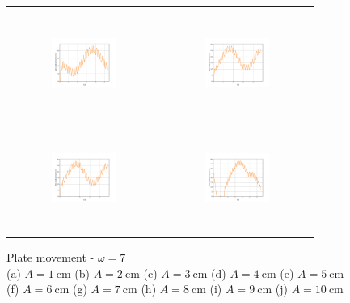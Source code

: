 \begin{figure}[H]
\begin{center}
\begin{tabular}{cc}
\includegraphics[width=0.45\textwidth, height=3.5cm]{graph/omega=2.00_A=7_plate.pdf}
&
\includegraphics[width=0.45\textwidth, height=3.5cm]{graph/omega=2.00_A=8_plate.pdf}\\
\includegraphics[width=0.45\textwidth, height=3.5cm]{graph/omega=2.00_A=9_plate.pdf}
&
\includegraphics[width=0.45\textwidth, height=3.5cm]{graph/omega=2.00_A=10_plate.pdf}\\
\end{tabular}
\end{center}
\caption{Plate movement - $\omega=7$ \\ (a) $A=1\mathrm{~cm}$ (b) $A=2\mathrm{~cm}$ (c) $A=3\mathrm{~cm}$ (d) $A=4\mathrm{~cm}$ (e) $A=5\mathrm{~cm}$\\(f) $A=6\mathrm{~cm}$ (g) $A=7\mathrm{~cm}$ (h) $A=8\mathrm{~cm}$ (i) $A=9\mathrm{~cm}$ (j) $A=10\mathrm{~cm}$}
\label{Data_omega=7_plate}
\end{figure}

